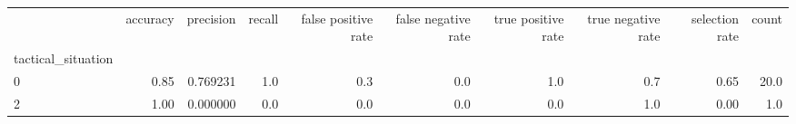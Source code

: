 \begin{tabular}{lrrrrrrrrr}
\toprule
{} &  accuracy &  precision &  recall &  false positive rate &  false negative rate &  true positive rate &  true negative rate &  selection rate &  count \\
tactical\_situation &           &            &         &                      &                      &                     &                     &                 &        \\
\midrule
0                  &      0.85 &   0.769231 &     1.0 &                  0.3 &                  0.0 &                 1.0 &                 0.7 &            0.65 &   20.0 \\
2                  &      1.00 &   0.000000 &     0.0 &                  0.0 &                  0.0 &                 0.0 &                 1.0 &            0.00 &    1.0 \\
\bottomrule
\end{tabular}
